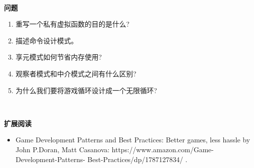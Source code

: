 \noindent\textbf{}\ \par
\textbf{问题} \ \par
\begin{enumerate}
	\item 重写一个私有虚拟函数的目的是什么?
	\item 描述命令设计模式。
	\item 享元模式如何节省内存使用?
	\item 观察者模式和中介模式之间有什么区别?
	\item 为什么我们要将游戏循环设计成一个无限循环?
\end{enumerate}

\noindent\textbf{}\ \par
\textbf{扩展阅读} \ \par
\begin{itemize}
	\item Game Development Patterns and Best Practices: Better games, less hassle by John P.Doran, Matt Casanova:  https:/​/​www.​amazon.​com/​Game-​Development-​Patterns-	Best-​Practices/​dp/​1787127834/​ .
\end{itemize}

\newpage









